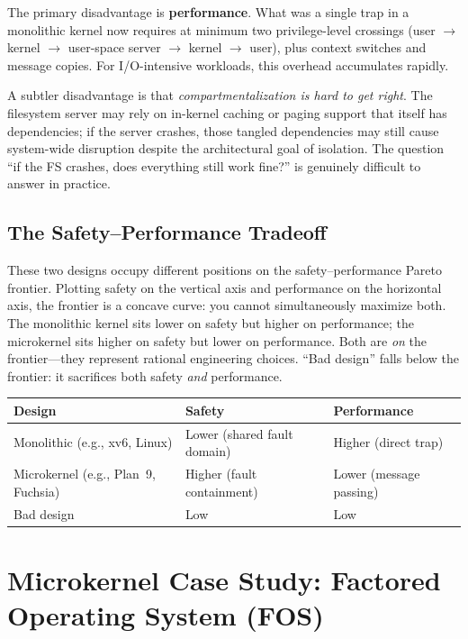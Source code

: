 \documentclass[11pt]{article}
\begin{document}
The primary disadvantage is \textbf{performance}. What was a single trap in a monolithic kernel now requires at minimum two privilege-level crossings (user $\to$ kernel $\to$ user-space server $\to$ kernel $\to$ user), plus context switches and message copies. For I/O-intensive workloads, this overhead accumulates rapidly.

A subtler disadvantage is that \emph{compartmentalization is hard to get right}. The filesystem server may rely on in-kernel caching or paging support that itself has dependencies; if the server crashes, those tangled dependencies may still cause system-wide disruption despite the architectural goal of isolation. The question ``if the FS crashes, does everything still work fine?'' is genuinely difficult to answer in practice.

\subsection{The Safety--Performance Tradeoff}

These two designs occupy different positions on the safety--performance Pareto frontier. Plotting safety on the vertical axis and performance on the horizontal axis, the frontier is a concave curve: you cannot simultaneously maximize both. The monolithic kernel sits lower on safety but higher on performance; the microkernel sits higher on safety but lower on performance. Both are \emph{on} the frontier---they represent rational engineering choices. ``Bad design'' falls below the frontier: it sacrifices both safety \emph{and} performance.

\begin{center}
\begin{tabular}{lll}
\toprule
\textbf{Design} & \textbf{Safety} & \textbf{Performance} \\
\midrule
Monolithic (e.g., xv6, Linux) & Lower (shared fault domain) & Higher (direct trap) \\
Microkernel (e.g., Plan~9, Fuchsia) & Higher (fault containment) & Lower (message passing) \\
Bad design & Low & Low \\
\bottomrule
\end{tabular}
\end{center}

\section{Microkernel Case Study: Factored Operating System (FOS)}
\end{document}
